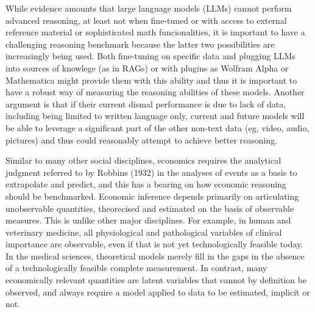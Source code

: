 \documentclass[
]{article}
\begin{document}
While evidence amounts that large language models (LLMs) cannot perform
advanced reasoning, at least not when fine-tuned or with access to
external reference material or sophisticated math funcionalities, it is
important to have a challenging reasoning benchmark because the latter
two possibilities are increasingly being used. Both fine-tuning on
specific data and plugging LLMs into sources of knowlege (as in RAGs) or
with plugins as Wolfram Alpha or Mathematica might provide them with
this ability and thus it is important to have a robust way of measuring
the reasoning abilities of these models. Another argument is that if
their current dismal performance is due to lack of data, including being
limited to written language only, current and future models will be able
to leverage a significant part of the other non-text data (eg, video,
audio, pictures) and thus could reasonably attempt to achieve better
reasoning.

Similar to many other social disciplines, economics requires the
analytical judgment referred to by Robbins (1932) in the analyses of
events as a basis to extrapolate and predict, and this has a bearing on
how economic reasoning should be benchmarked. Economic inference depends
primarily on articulating unobservable quantities, theorecised and
estimated on the basis of observable measures. This is unlike other
major disciplines. For example, in human and veterinary medicine, all
physiological and pathological variables of clinical importance are
observable, even if that is not yet technologically feasible today. In
the medical sciences, theoretical models merely fill in the gaps in the
absence of a technologically feasible complete measurement. In contrast,
many economically relevant quantities are latent variables that cannot
by definition be observed, and always require a model applied to data to
be estimated, implicit or not.
\end{document}
